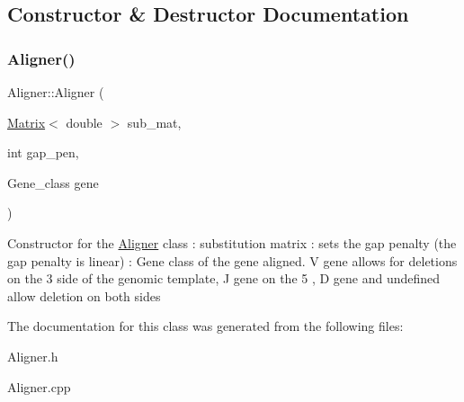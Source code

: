 \subsection{Constructor \& Destructor Documentation}
\mbox{\label{classAligner_ae8140f4445276cb5160fffe70c86c8d9}} 
\subsubsection{\texorpdfstring{Aligner()}{Aligner()}}
{\footnotesize\ttfamily Aligner\+::\+Aligner (\begin{DoxyParamCaption}\item[{\hyperlink{structMatrix}{Matrix}$<$ double $>$}]{sub\+\_\+mat,  }\item[{int}]{gap\+\_\+pen,  }\item[{Gene\+\_\+class}]{gene }\end{DoxyParamCaption})}

Constructor for the \hyperlink{classAligner}{Aligner} class  \+: substitution matrix  \+: sets the gap penalty (the gap penalty is linear)  \+: Gene class of the gene aligned. V gene allows for deletions on the 3\textquotesingle{} side of the genomic template, J gene on the 5\textquotesingle{} , D gene and undefined allow deletion on both sides 

The documentation for this class was generated from the following files\+:\begin{DoxyCompactItemize}
\item 
Aligner.\+h\item 
Aligner.\+cpp\end{DoxyCompactItemize}
